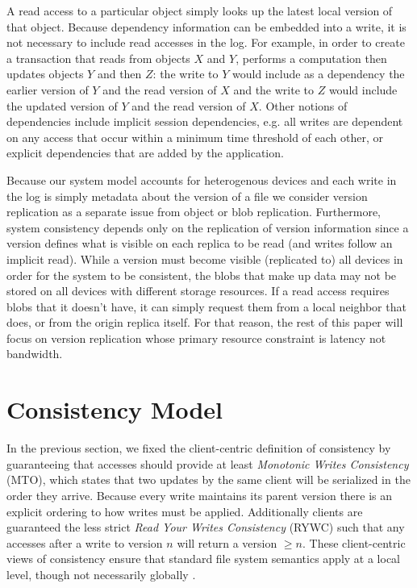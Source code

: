 \documentclass[10pt,conference,letterpaper]{IEEEtran}
\begin{document}
A read access to a particular object simply looks up the latest local version of that object. Because dependency information can be embedded into a write, it is not necessary to include read accesses in the log. For example, in order to create a transaction that reads from objects $X$ and $Y$, performs a computation then updates objects $Y$ and then $Z$: the write to $Y$ would include as a dependency the earlier version of $Y$ and the read version of $X$ and the write to $Z$ would include the updated version of $Y$ and the read version of $X$. Other notions of dependencies include implicit session dependencies, e.g. all writes are dependent on any access that occur within a minimum time threshold of each other, or explicit dependencies that are added by the application.

Because our system model accounts for heterogenous devices and each write in the log is simply metadata about the version of a file we consider version replication as a separate issue from object or blob replication. Furthermore, system consistency depends only on the replication of version information since a version defines what is visible on each replica to be read (and writes follow an implicit read). While a version must become visible (replicated to) all devices in order for the system to be consistent, the blobs that make up data may not be stored on all devices with different storage resources. If a read access requires blobs that it doesn't have, it can simply request them from a local neighbor that does, or from the origin replica itself. For that reason, the rest of this paper will focus on version replication whose primary resource constraint is latency not bandwidth.

\section{Consistency Model}

In the previous section, we fixed the client-centric definition of consistency by guaranteeing that accesses should provide at least \textit{Monotonic Writes Consistency} (MTO), which states that two updates by the same client will be serialized in the order they arrive. Because every write maintains its parent version there is an explicit ordering to how writes must be applied. Additionally clients are guaranteed the less strict \textit{Read Your Writes Consistency} (RYWC) such that any accesses after a write to version $n$ will return a version $\geq n$. These client-centric views of consistency ensure that standard file system semantics apply at a local level, though not necessarily globally \cite{bermbach_consistency_2013}.
\end{document}
